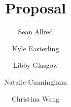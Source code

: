 \documentclass{article}
\title{Proposal}
\author{%
  Sean Allred \and
  Kyle Easterling \and
  Libby Glasgow \and
  Natalie Cunningham \and
  Christina Wang}
\begin{document}
\maketitle
\noindent
\end{document}
